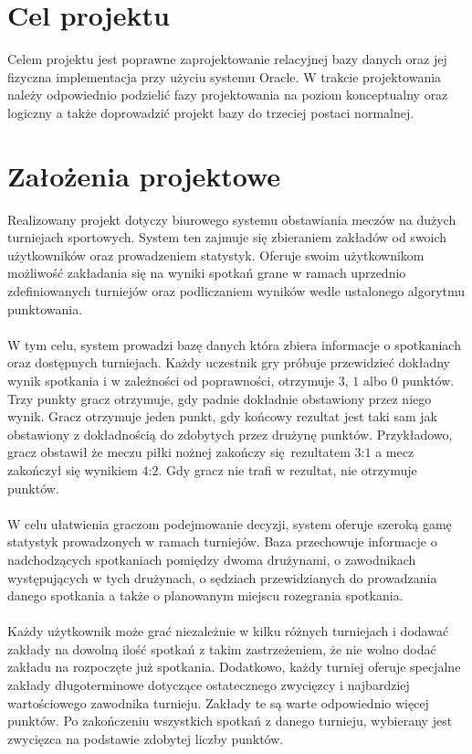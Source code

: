 \documentclass{mwrep}[15pt]
\begin{document}
\section{Cel projektu}
Celem projektu jest poprawne zaprojektowanie relacyjnej bazy danych oraz jej
fizyczna implementacja przy użyciu systemu Oracle. W trakcie projektowania należy
odpowiednio podzielić fazy projektowania na poziom konceptualny oraz logiczny a także 
doprowadzić projekt bazy do trzeciej postaci normalnej.

\section{Założenia projektowe}
Realizowany projekt dotyczy biurowego systemu obstawiania meczów
na dużych turniejach sportowych. System ten zajmuje się zbieraniem 
zakładów od swoich użytkowników oraz prowadzeniem statystyk. 
Oferuje swoim użytkownikom możliwość zakładania się na wyniki spotkań
grane w ramach uprzednio zdefiniowanych turniejów oraz podliczaniem 
wyników wedle ustalonego algorytmu punktowania.
\\ 
\\
\indent W tym celu, system prowadzi bazę danych która zbiera informacje o spotkaniach
oraz dostępnych turniejach. Każdy uczestnik gry próbuje przewidzieć dokładny wynik 
spotkania i w zależności od poprawności, otrzymuje $3$, $1$ albo $0$ punktów.
Trzy punkty gracz otrzymuje, gdy padnie dokładnie obstawiony przez niego wynik.
Gracz otrzymuje jeden punkt, gdy końcowy rezultat jest taki sam jak obstawiony z dokładnością
do zdobytych przez drużynę punktów. Przykładowo, gracz obstawił że meczu piłki
nożnej zakończy się rezultatem $3$:$1$ a mecz zakończył się wynikiem $4$:$2$. 
Gdy gracz nie trafi w rezultat, nie otrzymuje punktów.  
\\
\\
\indent W celu ułatwienia graczom podejmowanie decyzji, system oferuje szeroką gamę statystyk 
prowadzonych w ramach turniejów. Baza przechowuje informacje o nadchodzących spotkaniach 
pomiędzy dwoma drużynami, o zawodnikach występujących w tych drużynach, o sędziach 
przewidzianych do prowadzania danego spotkania a także o planowanym miejscu rozegrania spotkania.  
\\
\\
\indent Każdy użytkownik może grać niezależnie w kilku różnych turniejach i dodawać zakłady 
na dowolną ilość spotkań z takim zastrzeżeniem, że nie wolno dodać zakładu na 
rozpoczęte już spotkania. Dodatkowo, każdy turniej oferuje specjalne zakłady długoterminowe
dotyczące ostatecznego zwycięzcy i najbardziej wartościowego zawodnika turnieju. Zakłady 
te są warte odpowiednio więcej punktów. Po zakończeniu wszystkich spotkań z danego turnieju, wybierany 
jest zwycięzca na podstawie zdobytej liczby punktów. 
\end{document}
